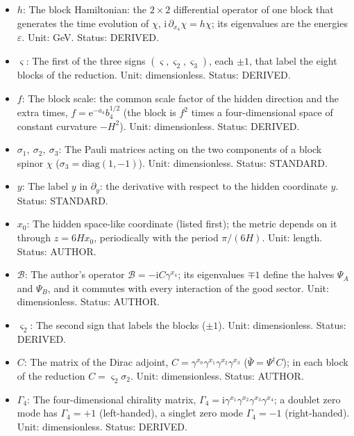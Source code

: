 \documentclass[
  10pt,
]{article}
\begin{document}
\begin{itemize}
  \(\partial X/\partial Y\) the derivative of \(X\) with respect to
  \(Y\) at fixed other variables. Status: STANDARD.
\item
  \(h\): The block Hamiltonian: the \(2 \times 2\) differential operator
  of one block that generates the time evolution of \(\chi\),
  \(\mathrm{i}\,\partial_{x_4}\chi = h\chi\); its eigenvalues are the
  energies \(\varepsilon\). Unit: GeV. Status: DERIVED.
\item
  \(\varsigma\): The first of the three signs
  \((\varsigma, \varsigma_2, \varsigma_3)\), each \(\pm1\), that label
  the eight blocks of the reduction. Unit: dimensionless. Status:
  DERIVED.
\item
  \(f\): The block scale: the common scale factor of the hidden
  direction and the extra times, \(f = \mathrm{e}^{-a_4}b_4^{1/2}\) (the
  block is \(f^2\) times a four-dimensional space of constant curvature
  \(-H^2\)). Unit: dimensionless. Status: DERIVED.
\item
  \(\sigma_1,\ \sigma_2,\ \sigma_3\): The Pauli matrices acting on the
  two components of a block spinor \(\chi\)
  (\(\sigma_3 = \mathrm{diag}(1, -1)\)). Unit: dimensionless. Status:
  STANDARD.
\item
  \(y\): The label \(y\) in \(\partial_y\): the derivative with respect
  to the hidden coordinate \(y\). Status: STANDARD.
\item
  \(x_0\): The hidden space-like coordinate (listed first); the metric
  depends on it through \(z = 6Hx_0\), periodically with the period
  \(\pi/(6H)\). Unit: length. Status: AUTHOR.
\item
  \(\mathcal{B}\): The author's operator
  \(\mathcal{B} = -\mathrm{i}C\gamma^{x_4}\); its eigenvalues \(\mp1\)
  define the halves \(\Psi_A\) and \(\Psi_B\), and it commutes with
  every interaction of the good sector. Unit: dimensionless. Status:
  AUTHOR.
\item
  \(\varsigma_2\): The second sign that labels the blocks (\(\pm1\)).
  Unit: dimensionless. Status: DERIVED.
\item
  \(C\): The matrix of the Dirac adjoint,
  \(C = \gamma^{x_0}\gamma^{x_1}\gamma^{x_2}\gamma^{x_3}\)
  (\(\bar\Psi = \Psi^\dagger C\)); in each block of the reduction
  \(C = \varsigma_2\sigma_2\). Unit: dimensionless. Status: AUTHOR.
\item
  \(\Gamma_4\): The four-dimensional chirality matrix,
  \(\Gamma_4 = \mathrm{i}\gamma^{x_1}\gamma^{x_2}\gamma^{x_3}\gamma^{x_4}\);
  a doublet zero mode has \(\Gamma_4 = +1\) (left-handed), a singlet
  zero mode \(\Gamma_4 = -1\) (right-handed). Unit: dimensionless.
  Status: DERIVED.
\end{itemize}
\end{document}
